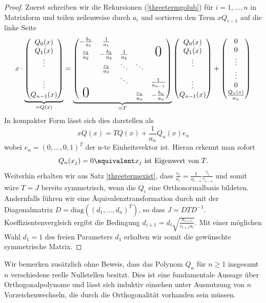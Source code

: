\begin{proof}
Zuerst schreiben wir die Rekursionen (\ref{threetermgolub}) für $i=1,\dots,n$ in Matrixform und teilen zeilenweise durch $a_i$ und sortieren den Term $xQ_{i-1}$ auf die linke Seite
\begin{equation*}
x\cdot
\underbrace{\begin{pmatrix}Q_0(x)\\ Q_1(x) \\ \vdots \\ \\ \vdots \\ Q_{n-1}(x)\end{pmatrix}}_{=Q(x)}
=\underbrace{\begin{pmatrix}
-\frac{b_1}{a_1} & \frac{1}{a_1} &  &  &  \\ 
\frac{c_2}{a_2} & -\frac{b_2}{a_2} & \frac{1}{a_2} & & \text{\huge0} \\ 
 & \frac{c_3}{a_3} & \ddots & \ddots &  \\ 
 &  & \ddots & & \frac{1}{a_{n-1}} \\
\text{\huge0} &  &  & \frac{c_n}{a_n} & -\frac{b_n}{a_n}
\end{pmatrix}}_{=T}
\begin{pmatrix}Q_0(x)\\ Q_1(x) \\ \vdots \\ \\ \vdots \\ Q_{n-1}(x)\end{pmatrix} 
+\begin{pmatrix}0 \\ 0 \\ \vdots \\ \vdots \\ 0 \\ \frac{Q_{n}(x)}{a_n}\end{pmatrix} 
\end{equation*}
In kompakter Form lässt sich dies darstellen als
\[xQ(x)=TQ(x)+\frac{1}{a_n}Q_n(x)e_n\]
wobei $e_n=(0,\dots,0,1)^T$ der n-te Einheitsvektor ist. Hieran erkennt man sofort \[Q_n(x_j)=0\equivalent x_j\text{ ist Eigenwert von }T.\]
Weiterhin erhalten wir aus Satz \ref{threetermexist}, dass $\frac{c_i}{a_i}=\frac{1}{a_{i-1}}\frac{\gamma_i}{\gamma_{i-1}}$ und somit wäre $T=J$ bereits symmetrisch, wenn die $Q_i$ eine Orthonormalbasis bildeten.\\
Andernfalls führen wir eine Äquivalenztransformation durch mit der Diagonalmatrix $D=\text{diag}\left((d_1,\dots,d_n)^T\right)$, so dass $J=DTD^{-1}$. Koeffizientenvergleich ergibt die Bedingung $d_{i+1}=d_i\sqrt{\frac{a_{i+1}}{c_{i+1}a_i}}$. Mit einer möglichen Wahl $d_1=1$ des freien Parameters $d_1$ erhalten wir somit die gewünschte symmetrische Matrix.
\end{proof}
Wir bemerken zusätzlich ohne Beweis, dass das Polynom $Q_n$ für $n\ge 1$ insgesamt $n$ verschiedene reelle Nullstellen besitzt. Dies ist eine fundamentale Aussage über Orthogonalpolynome und lässt sich induktiv einsehen unter Ausnutzung von $n$ Vorzeichenwechseln, die durch die Orthogonalität vorhanden sein müssen.

